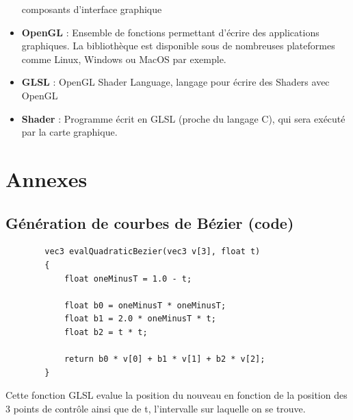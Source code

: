 \documentclass[12pt]{article}
\begin{document}
\begin{itemize}
		composants d'interface graphique\\
		\item[]\textbf{OpenGL} : Ensemble de fonctions permettant d'écrire des applications graphiques.
		La bibliothèque est disponible sous de nombreuses plateformes comme Linux, Windows ou MacOS par
		exemple.
		\item[]\textbf{GLSL} : OpenGL Shader Language, langage pour écrire des Shaders avec OpenGL\\
		\item[]\textbf{Shader} : Programme écrit en GLSL (proche du langage C), qui sera
		exécuté par la carte graphique.\\
	\end{itemize}
	
	\newpage
		
	
	\newpage
	\section{Annexes}
		\subsection{Génération de courbes de Bézier (code)}	\label{code_courbes_bezier}
		
		\begin{lstlisting}
		vec3 evalQuadraticBezier(vec3 v[3], float t)
		{
		    float oneMinusT = 1.0 - t;

		    float b0 = oneMinusT * oneMinusT;
		    float b1 = 2.0 * oneMinusT * t;
		    float b2 = t * t;
		    
		    return b0 * v[0] + b1 * v[1] + b2 * v[2];
		}
		\end{lstlisting}
		
		Cette fonction GLSL evalue la position du nouveau en fonction de la position des 3
		points de contrôle ainsi que de t, l'intervalle sur laquelle on se trouve.\\
		
\end{document}
